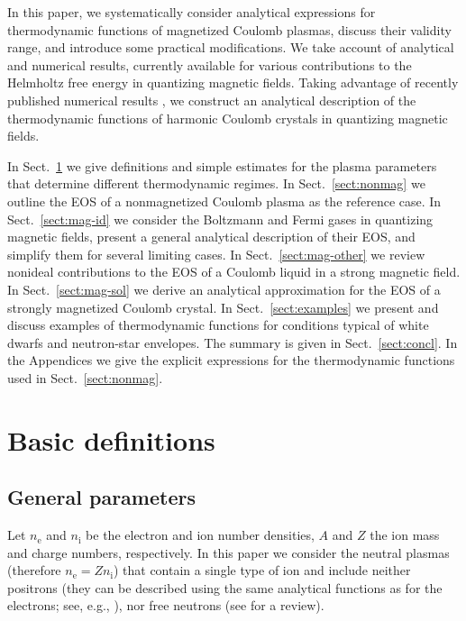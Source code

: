 \documentclass[traditabstract]{aa}
\newcommand{\nel}{n_\mathrm{e}}
\newcommand{\nion}{n_\mathrm{i}}
\begin{document}
In this paper, we systematically consider analytical
expressions for thermodynamic functions of  magnetized
Coulomb plasmas, discuss their validity range, and introduce
some practical modifications.  We take account of analytical
and numerical results, currently available for various
contributions to the Helmholtz free energy in quantizing
magnetic fields. Taking advantage of recently published
numerical results \citep{Baiko09}, we construct an
analytical description of the thermodynamic functions of
harmonic Coulomb crystals in quantizing magnetic fields.

In Sect.~\ref{sect:plasmpar} we give definitions and simple
estimates for the plasma parameters that determine different
thermodynamic regimes. In Sect.~\ref{sect:nonmag} we 
outline the EOS of a nonmagnetized Coulomb plasma as
the reference case. In Sect.~\ref{sect:mag-id} we consider 
the Boltzmann and Fermi gases in quantizing magnetic fields,
present a general analytical description of their EOS, and
simplify them for several limiting cases. In
Sect.~\ref{sect:mag-other} we review nonideal contributions
to the EOS of a Coulomb liquid in a strong magnetic field.
In Sect.~\ref{sect:mag-sol} we derive an analytical
approximation for the EOS of a strongly magnetized Coulomb
crystal. In Sect.~\ref{sect:examples} we present and discuss
examples of thermodynamic functions for conditions typical
of white dwarfs and neutron-star envelopes. The summary is
given in Sect.~\ref{sect:concl}.
In the Appendices we give the explicit expressions for
the thermodynamic functions used in
Sect.~\ref{sect:nonmag}.

\section{Basic definitions}
\label{sect:plasmpar}

\subsection{General parameters}
\label{sect:gen}

Let $\nel$ and $\nion$ be the electron and ion number
densities, $A$ and $Z$ the ion mass and charge numbers,
respectively. In this paper we consider the neutral plasmas
(therefore $\nel = Z \nion$) that contain
a single type of ion and include neither positrons (they
can be described using the same analytical functions as for
the electrons; see, e.g., \citealp{Blin,TimmesArnett}), nor
free neutrons (see \citealp{NSB1} for a review).
\end{document}
